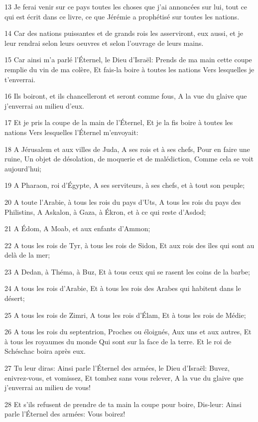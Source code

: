 \par 13 Je ferai venir sur ce pays toutes les choses que j'ai annoncées sur lui, tout ce qui est écrit dans ce livre, ce que Jérémie a prophétisé sur toutes les nations.
\par 14 Car des nations puissantes et de grands rois les asserviront, eux aussi, et je leur rendrai selon leurs oeuvres et selon l'ouvrage de leurs mains.
\par 15 Car ainsi m'a parlé l'Éternel, le Dieu d'Israël: Prends de ma main cette coupe remplie du vin de ma colère, Et fais-la boire à toutes les nations Vers lesquelles je t'enverrai.
\par 16 Ils boiront, et ils chancelleront et seront comme fous, A la vue du glaive que j'enverrai au milieu d'eux.
\par 17 Et je pris la coupe de la main de l'Éternel, Et je la fis boire à toutes les nations Vers lesquelles l'Éternel m'envoyait:
\par 18 A Jérusalem et aux villes de Juda, A ses rois et à ses chefs, Pour en faire une ruine, Un objet de désolation, de moquerie et de malédiction, Comme cela se voit aujourd'hui;
\par 19 A Pharaon, roi d'Égypte, A ses serviteurs, à ses chefs, et à tout son peuple;
\par 20 A toute l'Arabie, à tous les rois du pays d'Uts, A tous les rois du pays des Philistins, A Askalon, à Gaza, à Ékron, et à ce qui reste d'Asdod;
\par 21 A Édom, A Moab, et aux enfants d'Ammon;
\par 22 A tous les rois de Tyr, à tous les rois de Sidon, Et aux rois des îles qui sont au delà de la mer;
\par 23 A Dedan, à Théma, à Buz, Et à tous ceux qui se rasent les coins de la barbe;
\par 24 A tous les rois d'Arabie, Et à tous les rois des Arabes qui habitent dans le désert;
\par 25 A tous les rois de Zimri, A tous les rois d'Élam, Et à tous les rois de Médie;
\par 26 A tous les rois du septentrion, Proches ou éloignés, Aux uns et aux autres, Et à tous les royaumes du monde Qui sont sur la face de la terre. Et le roi de Schéschac boira après eux.
\par 27 Tu leur diras: Ainsi parle l'Éternel des armées, le Dieu d'Israël: Buvez, enivrez-vous, et vomissez, Et tombez sans vous relever, A la vue du glaive que j'enverrai au milieu de vous!
\par 28 Et s'ils refusent de prendre de ta main la coupe pour boire, Dis-leur: Ainsi parle l'Éternel des armées: Vous boirez!

